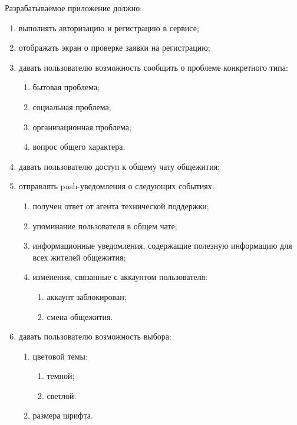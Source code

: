 Разрабатываемое приложение должно:

\begin{enumerate}
    \item выполнять авторизацию и регистрацию в сервисе;
    \item отображать экран о проверке заявки на регистрацию;
    \item давать пользователю возможность сообщить о проблеме конкретного типа:
    \begin{enumerate}
        \item бытовая проблема;
        \item социальная проблема;
        \item организационная проблема;
        \item вопрос общего характера.
    \end{enumerate}
    \item давать пользователю доступ к общему чату общежития;
    \item отправлять push-уведомления о следующих событиях:
    \begin{enumerate}
        \item получен ответ от агента технической поддержки;
        \item упоминание пользователя в общем чате;
        \item информационные уведомления, содержащие полезную информацию для всех жителей общежития;
        \item изменения, связанные с аккаунтом пользователя:
        \begin{enumerate}
            \item аккаунт заблокирован;
            \item смена общежития.
        \end{enumerate}
    \end{enumerate}
    \item давать пользователю возможность выбора:
    \begin{enumerate}
        \item цветовой темы:
        \begin{enumerate}
            \item темной;
            \item светлой.
        \end{enumerate}
        \item размера шрифта.
    \end{enumerate}
\end{enumerate}
